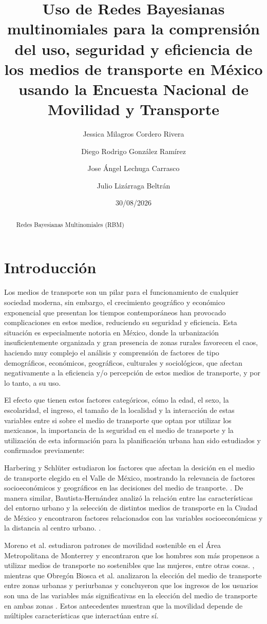\documentclass[
  letterpaper,
  DIV=11,
  numbers=noendperiod]{scrartcl}
\title{Uso de Redes Bayesianas multinomiales para la comprensión del uso, seguridad y eficiencia de los medios de transporte en México usando la Encuesta Nacional de Movilidad y Transporte}
\author{
Jessica Milagros Cordero Rivera
\and
Diego Rodrigo González Ramírez
\and
Jose Ángel Lechuga Carrasco
\and
Julio Lizárraga Beltrán
}
\date{30/08/2026}
\begin{document}
\maketitle



\begin{abstract}
Redes Bayesianas Multinomiales (RBM)
\end{abstract}



\section{Introducción}\label{Introducción}
Los medios de transporte son un pilar para el funcionamiento de cualquier sociedad 
moderna, sin embargo, el crecimiento geográfico y económico exponencial que presentan 
los tiempos contemporáneos han provocado complicaciones en estos medios, reduciendo su 
seguridad y eficiencia. Esta situación es especialmente notoria en México, donde la 
urbanización insuficientemente organizada y gran presencia de zonas rurales favorecen 
el caos, haciendo muy complejo el análisis y comprensión de factores de tipo 
demográficos, económicos, geográficos, culturales y sociológicos, que afectan 
negativamente a la eficiencia y/o percepción de estos medios de transporte, 
y por lo tanto, a su uso.

El efecto que tienen estos factores categóricos, cómo la edad, el sexo, la 
escolaridad, el ingreso, el tamaño de la localidad y la interacción 
de estas variables entre si sobre el medio de transporte que optan por 
utilizar los mexicanos, la importancia de la seguridad en el medio 
de transporte y la utilización de esta información para la planificación  
urbana han sido estudiados y confirmados previamente:

Harbering y Schl{\"u}ter estudiaron los factores que afectan la desición en el medio 
de transporte elegido en el Valle de México, mostrando la relevancia de factores 
socioeconómicos y geográficos en las decisiones del medio de tranporte. \cite{Harbering2020}. 
De manera similar, Bautista-Hernández analizó la relación entre las características 
del entorno urbano y la selección de distintos medios de transporte en la Ciudad 
de México y encontraron factores relacionados con las variables socioeconómicas 
y la distancia al centro urbano.
\cite{BautistaHernandez2021}.

Moreno et al. estudiaron patrones de movilidad sostenible en el Área Metropolitana 
de Monterrey y encontraron que los hombres son más propensos a utilizar 
medios de transporte no sostenibles que las mujeres, entre otras cosas.
\cite{Moreno2023}, mientras que Obregón Biosca et al. analizaron la elección 
del medio de transporte entre zonas urbanas y periurbanas y concluyeron que 
los ingresos de los usuarios son una de las variables más significativas en 
la elección del medio de transporte en ambas zonas \cite{ObregonBiosca2018}. 
Estos antecedentes muestran que la movilidad depende de múltiples características que 
interactúan entre sí.
\end{document}
